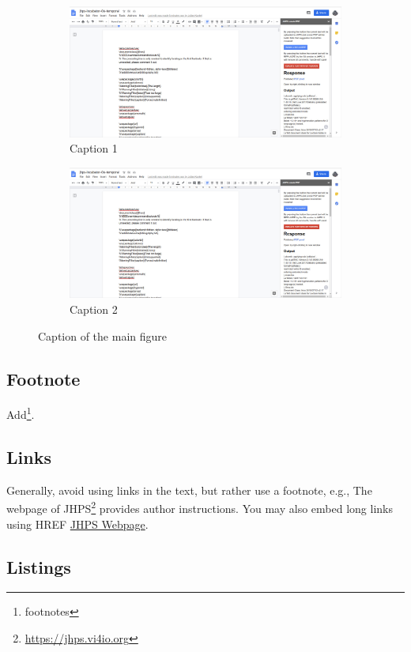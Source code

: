 \documentclass{jhps}
\begin{document}
\begin{figure}
  \begin{subfigure}[t]{3cm}
  	\includegraphics[width=\textwidth]{jhps}
  	\caption{Caption 1}\label{fig:1a}
  \end{subfigure}
  \quad
  \begin{subfigure}[t]{3cm}
  	\includegraphics[width=\textwidth]{jhps}
  	\caption{Caption 2}\label{fig:1b}
  \end{subfigure}
  \caption{Caption of the main figure}\label{fig:1}
\end{figure}

\subsection{Footnote}
Add\footnote{footnotes}.

\subsection{Links}
Generally, avoid using links in the text, but rather use a footnote, e.g.,
The webpage of JHPS\footnote{\url{https://jhps.vi4io.org}} provides author instructions.
You may also embed long links using HREF \href{https://jhps.vi4io.org}{JHPS Webpage}.

\subsection{Listings}
\end{document}
